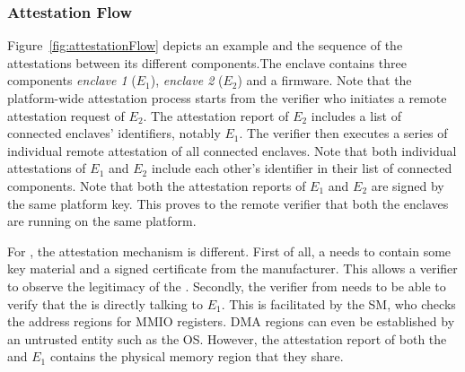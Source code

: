 \subsubsection{Attestation Flow}

Figure~\ref{fig:attestationFlow} depicts an example \nameenclave{} and the sequence of the attestations between its different components.The \name enclave contains three components \emph{enclave 1} ($E_1$), \emph{enclave 2} ($E_2$) and a \sphw firmware. Note that the platform-wide attestation process starts from the verifier who initiates a remote attestation request of $E_2$. 
The attestation report of $E_2$ includes a list  of connected enclaves' identifiers, notably $E_1$. The verifier then executes a series of individual remote attestation of all connected enclaves. Note that both individual attestations of $E_1$ and $E_2$ include each other's identifier in their list of connected components. Note that both the attestation reports of $E_1$ and $E_2$ are signed by the same platform key. This proves to the remote verifier that both the enclaves are running on the same platform.

For \sphw, the attestation mechanism is different. First of all, a \sphw needs to contain some key material and a signed certificate from the manufacturer. This allows a verifier to observe the legitimacy of the \sphw. Secondly, the verifier from  needs to be able to verify that the \sphw is directly talking to $E_1$. This is facilitated by the SM, who checks the address regions for MMIO registers. DMA regions can even be established by an untrusted entity such as the OS. However, the attestation report of both the \sphw and $E_1$ contains the physical memory region that they share.

